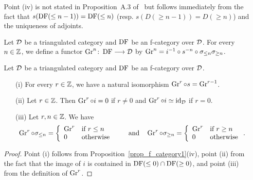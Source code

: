 Point (iv) is not stated in Proposition~A.3 of~\cite{Be1} but follows immediately from the fact that $s(\operatorname{DF}(\leq n -1))=\operatorname{DF}(\leq n)$ (resp. $s(D(\geq n-1))=D(\geq n)$) and the uniqueness
of adjoints.

\begin{definition}
Let $\mathcal{D}$ be a triangulated category and $\operatorname{DF}$ be an f-category over $\mathcal{D}$. For every $n\in\mathbb{Z}$, we define a functor $\operatorname{Gr}^n\colon \operatorname{DF}\longrightarrow\mathcal{D}$ by
$\operatorname{Gr}^n=i^{-1}\circ s^{-n}\circ\sigma_{\leq n}\sigma_{\geq n}$.

\end{definition}

\begin{proposition}
Let $\mathcal{D}$ be a triangulated category and $\operatorname{DF}$ be an f-category over $\mathcal{D}$. 
\begin{itemize}
\item[(i)] For every $r\in\mathbb{Z}$, we have a natural isomorphism $\operatorname{Gr}^r\circ s=\operatorname{Gr}^{r-1}$. 

\item[(ii)] Let $r\in\mathbb{Z}$. Then $\operatorname{Gr}^r\circ i=0$ if $r\ne 0$ and $\operatorname{Gr}^r\circ i\simeq\mathrm{id}_{\mathcal{D}}$ if $r=0$.

\item[(iii)] Let $r,n\in\mathbb{Z}$. We have
\[\operatorname{Gr}^r\circ\sigma_{\leq n}=\left\{\begin{array}{ll}\operatorname{Gr}^r& \mbox{if }r\leq  n\\ 0 & \mbox{otherwise}\end{array}\right.
\qquad\mbox{and}\quad\operatorname{Gr}^r\circ\sigma_{\geq n}=\left\{\begin{array}{ll}\operatorname{Gr}^r& \mbox{if }r\geq  n\\ 0 & \mbox{otherwise}\end{array}\right..\]

\end{itemize}
\label{prop_Gr}
\end{proposition}

\begin{proof}
Point (i) follows from Proposition~\ref{prop_f_category1}(iv), point (ii) from the fact that the image of $i$ is contained in $\operatorname{DF}(\leq 0)\cap\operatorname{DF}(\geq 0)$, and point (iii)
from the definition of $\operatorname{Gr}^r$.
\end{proof}

